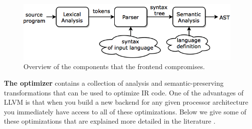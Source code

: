 \begin{figure}[b!]
\centering
\includegraphics[width=.7\textwidth]{figures/frontend}
\caption{Overview of the components that the frontend compromises.}
\label{fig:frontend}
\end{figure}

\textbf{The optimizer} contains a collection of analysis and semantic-preserving transformations that can be used to optimize IR code. One of the advantages of LLVM is that when you build a new backend for any given processor architecture you immediately have access to all of these optimizations. Below we give some of these optimizations that are explained more detailed in the literature \cite[Chapter~9]{dragon_book}.%
